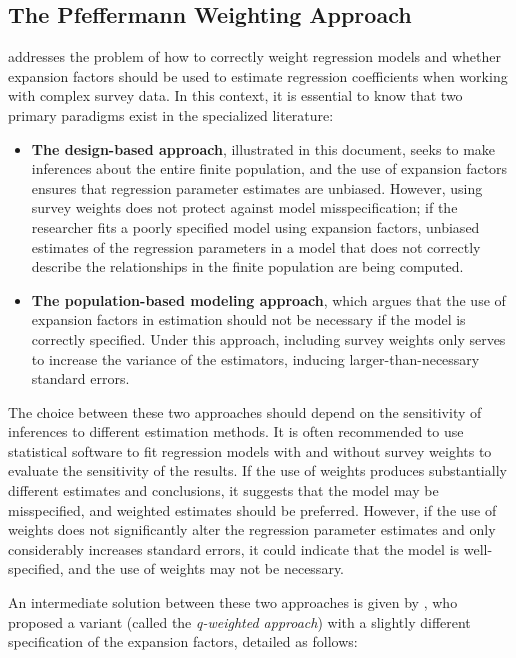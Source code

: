 \documentclass[
  12pt,
]{book}
\providecommand{\tightlist}{%
  \setlength{\itemsep}{0pt}\setlength{\parskip}{0pt}}
\begin{document}
\subsection{The Pfeffermann Weighting Approach}\label{the-pfeffermann-weighting-approach}

\citet{Heeringa_West_Berglund_2017} addresses the problem of how to correctly weight regression models and whether expansion factors should be used to estimate regression coefficients when working with complex survey data. In this context, it is essential to know that two primary paradigms exist in the specialized literature:

\begin{itemize}
\tightlist
\item
  \textbf{The design-based approach}, illustrated in this document, seeks to make inferences about the entire finite population, and the use of expansion factors ensures that regression parameter estimates are unbiased. However, using survey weights does not protect against model misspecification; if the researcher fits a poorly specified model using expansion factors, unbiased estimates of the regression parameters in a model that does not correctly describe the relationships in the finite population are being computed.
\item
  \textbf{The population-based modeling approach}, which argues that the use of expansion factors in estimation should not be necessary if the model is correctly specified. Under this approach, including survey weights only serves to increase the variance of the estimators, inducing larger-than-necessary standard errors.
\end{itemize}

The choice between these two approaches should depend on the sensitivity of inferences to different estimation methods. It is often recommended to use statistical software to fit regression models with and without survey weights to evaluate the sensitivity of the results. If the use of weights produces substantially different estimates and conclusions, it suggests that the model may be misspecified, and weighted estimates should be preferred. However, if the use of weights does not significantly alter the regression parameter estimates and only considerably increases standard errors, it could indicate that the model is well-specified, and the use of weights may not be necessary.

An intermediate solution between these two approaches is given by \citet{pfeffermann2011modelling}, who proposed a variant (called the \emph{q-weighted approach}) with a slightly different specification of the expansion factors, detailed as follows:
\end{document}
